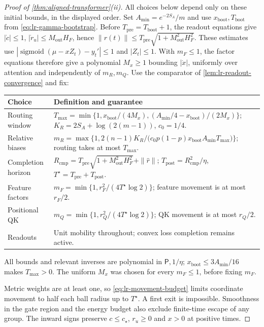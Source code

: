 \begin{proof}[Proof of \cref{thm:aligned-transformer}(ii)]
All choices below depend only on these initial bounds, in the displayed
order. Set $A_{\min}=e^{-2S_A}/m$ and use
$x_{\mathrm{boot}},T_{\mathrm{boot}}$ from \eqref{eq:lr-gamma-bootstrap}.
Before $T_{\mathrm{pre}}=T_{\mathrm{boot}}+1$, the readout equations give
$|\dot c|\le1$, $|\dot r_u|\le M_{\mathrm{out}}H_F$, hence
$\|r(t)\|\le T_{\mathrm{pre}}\sqrt{1+M_{\mathrm{out}}^2H_F^2}$.
These estimates use $|\operatorname{sigmoid}(\mu-xZ_t)-y_t'|\le1$ and
$|Z_t|\le1$. With $m_F\le1$, the factor equations therefore give a
polynomial $M_x\ge1$ bounding $|\dot x|$, uniformly over attention and
independently of $m_R,m_Q$. Use the comparator of
\cref{lem:lr-readout-convergence} and fix:
\begin{center}
\small
\begin{tabular}{@{}p{.20\linewidth}p{.74\linewidth}@{}}
\toprule
Choice & Definition and guarantee \\
\midrule
Routing window & $T_{\max}=\min\{1,x_{\mathrm{boot}}/(4M_x),
(A_{\min}/4-x_{\mathrm{boot}})/(2M_x)\}$;
$K_R=2S_A+\log(2(m-1))$, $c_0=1/4$. \\
Relative biases & $m_R=\max\{1,2(n-1)K_R/\bigl(c_0p(1-p)x_{\mathrm{boot}}A_{\min}T_{\max}\bigr)\}$;
routing takes at most $T_{\max}$. \\
Completion horizon & $R_{\mathrm{cmp}}=T_{\mathrm{pre}}\sqrt{1+M_{\mathrm{out}}^2H_F^2}+\|\widehat r\|$;
$T_{\mathrm{post}}=R_{\mathrm{cmp}}^2/\eta$,
$T^\star=T_{\mathrm{pre}}+T_{\mathrm{post}}$. \\
Feature factors & $m_F=\min\{1,r_F^2/(4T^\star\log2)\}$;
feature movement is at most $r_F/2$. \\
Positional QK & $m_Q=\min\{1,r_Q^2/(4T^\star\log2)\}$;
QK movement is at most $r_Q/2$. \\
Readouts & Unit mobility throughout; convex loss completion remains active. \\
\bottomrule
\end{tabular}
\end{center}
All bounds and relevant inverses are polynomial in $\mathsf P,1/\eta$;
$x_{\mathrm{boot}}\le3A_{\min}/16$ makes $T_{\max}>0$. The uniform $M_x$
was chosen for every $m_F\le1$, before fixing $m_F$.

Metric weights are at least one, so \eqref{eq:lr-movement-budget}
limits coordinate movement to half each ball radius up to $T^\star$.
A first exit is impossible. Smoothness in the gate region and the energy
budget also exclude finite-time escape of any group. The inward signs
preserve $c\le c_\star$, $r_u\ge0$ and $x>0$ at positive times.


\end{proof}
